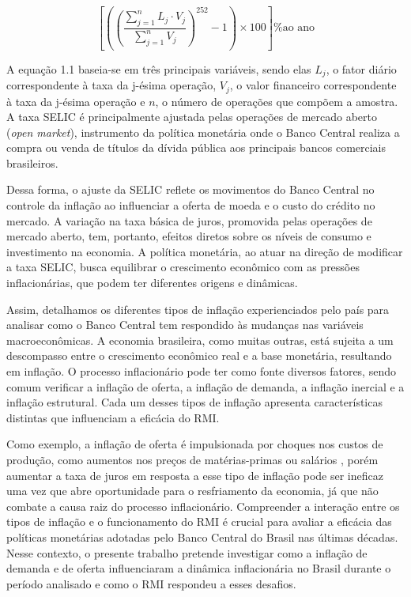 \documentclass[12pt,oneside,a4paper,chapter=TITLE,english,brazil,sumario=abnt-6027-2012]{abntex2}
\begin{document}
\begin{equation}
	\left[ \left( \left(\frac{\sum_{j=1}^{n} L_j \cdot V_j}{\sum_{j=1}^{n} V_j} \right)^{252} - 1 \right) \times 100 \right] \textrm{\% ao ano}
\end{equation}


A equação 1.1 baseia-se em três principais variáveis, sendo elas $L_j$, o fator diário correspondente à taxa da j-ésima operação, $V_j$, o valor financeiro correspondente à taxa da j-ésima operação e $n$, o número de operações que compõem a amostra. A taxa SELIC é principalmente ajustada pelas operações de mercado aberto (\textit{open market}), instrumento da política monetária onde o Banco Central realiza a compra ou venda de títulos da dívida pública aos principais bancos comerciais brasileiros.

Dessa forma, o ajuste da SELIC reflete os movimentos do Banco Central no controle da inflação ao influenciar a oferta de moeda e o custo do crédito no mercado. A variação na taxa básica de juros, promovida pelas operações de mercado aberto, tem, portanto, efeitos diretos sobre os níveis de consumo e investimento na economia. A política monetária, ao atuar na direção de modificar a taxa SELIC, busca equilibrar o crescimento econômico com as pressões inflacionárias, que podem ter diferentes origens e dinâmicas.

Assim, detalhamos os diferentes tipos de inflação experienciados pelo país para analisar como o Banco Central tem respondido às mudanças nas variáveis macroeconômicas. A economia brasileira, como muitas outras, está sujeita a um descompasso entre o crescimento econômico real e a base monetária, resultando em inflação. O processo inflacionário pode ter como fonte diversos fatores, sendo comum verificar a inflação de oferta, a inflação de demanda, a inflação inercial e a inflação estrutural. Cada um desses tipos de inflação apresenta características distintas que influenciam a eficácia do RMI.

Como exemplo, a inflação de oferta é impulsionada por choques nos custos de produção, como aumentos nos preços de matérias-primas ou salários \cite{blinder_2008_the}, porém aumentar a taxa de juros em resposta a esse tipo de inflação pode ser ineficaz uma vez que abre oportunidade para o resfriamento da economia, já que não combate a causa raiz do processo inflacionário. Compreender a interação entre os tipos de inflação e o funcionamento do RMI é crucial para avaliar a eficácia das políticas monetárias adotadas pelo Banco Central do Brasil nas últimas décadas. Nesse contexto, o presente trabalho pretende investigar como a inflação de demanda e de oferta influenciaram a dinâmica inflacionária no Brasil durante o período analisado e como o RMI respondeu a esses desafios.
\end{document}
